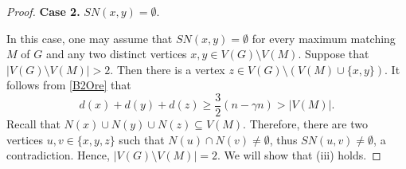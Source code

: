 \documentclass[10pt,a4paper]{amsart}
\begin{document}
\begin{proof}


\medskip
{\bf Case 2.} %
$SN(x,y)=\emptyset.$
\medskip

In this case, one may assume that 
$SN(x,y)=\emptyset$ for every maximum matching $M$ of $G$ and any two distinct  vertices $x,y\in V(G)\setminus V(M)$. Suppose that  $|V(G)\setminus V(M)|>2$. Then there is a vertex $z\in V(G)\setminus (V(M)\cup \{x,y\})$. It follows from  \eqref{B2Ore} that 
$$d(x)+d(y)+d(z)\ge \frac{3}{2}(n-\gamma n)>|V(M)|.$$ 
Recall that $N(x)\cup N(y)\cup N(z)\subseteq V(M)$. Therefore, there are two vertices $u,v\in \{x,y,z\}$ such that $N(u)\cap N(v)\neq \emptyset$, thus $SN(u,v)\neq \emptyset$, a contradiction. Hence, $|V(G)\setminus V(M)|=2$. We will show that (iii) holds. 



\end{proof}
\end{document}
